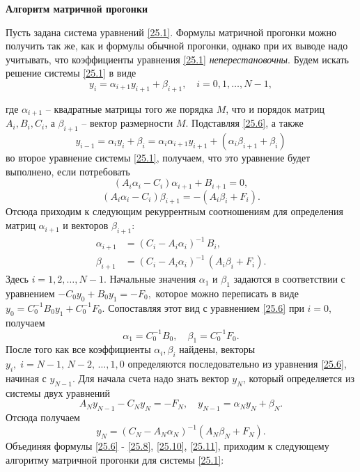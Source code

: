 \textbf{Алгоритм матричной прогонки}

Пусть задана система уравнений \eqref{25.1}. Формулы матричной прогонки можно получить так же, как и формулы обычной прогонки, однако при их выводе надо учитывать, что коэффициенты уравнения \eqref{25.1} \textit{неперестановочны}. Будем искать решение системы \eqref{25.1} в виде 
\begin{equation}\label{25.6}
    y_i = \alpha_{i+1} y_{i+1} + \beta_{i+1}, \quad i = 0, 1, \ldots, N-1,
\end{equation}

где $\alpha_{i+1}$ -- квадратные матрицы того же порядка $M$, что и порядок матриц $A_i, B_i, C_i$, а $\beta_{i+1}$ -- вектор размерности $M$. Подставляя \eqref{25.6}, а также 
$$y_{i-1} = \alpha_{i} y_{i} + \beta_{i} = \alpha_i \alpha_{i+1} y_{i+1} + (\alpha_i \beta_{i+1} + \beta_i)$$ 
во второе уравнение системы \eqref{25.1}, получаем, что это уравнение будет выполнено, если потребовать 
$$
(A_i \alpha_i - C_i) \alpha_{i+1} + B_{i+1} = 0,
$$
$$
(A_i \alpha_i - C_i) \beta_{i+1} = - (A_i\beta_i + F_i).
$$
Отсюда приходим к следующим рекуррентным соотношениям для определения матриц $\alpha_{i+1}$ и векторов $\beta_{i+1}$:
\begin{align}\label{25.7}
    \alpha_{i+1} &= (C_i - A_i \alpha_i)^{-1} \, B_i,\\
    \label{25.8}
    \beta_{i+1} &= (C_i - A_i \alpha_i)^{-1} \,(A_i \beta_i + F_i).
\end{align}
Здесь $i = 1, 2, \ldots, N-1$. Начальные значения $\alpha_1$ и $\beta_1$ задаются в соответствии с уравнением $-C_0 y_0 + B_0 y_1 = -F_0,$ которое можно переписать в виде $y_0 = C_0^{-1} B_0 y_1 + C_0^{-1}F_0$.
Сопоставляя этот вид с уравнением \eqref{25.6} при $i = 0$, получаем
\begin{equation}\label{25.10}
    \alpha_1 = C_0^{-1}B_0, \quad \beta_1 = C_0^{-1}F_0.
\end{equation}
После того как все коэффициенты $\alpha_i, \beta_i$ найдены, векторы $y_i, \; i = N-1, \,N-2, \,\ldots, 1, 0$ определяются последовательно из уравнения \eqref{25.6}, начиная с $y_{N-1}$. Для начала счета надо знать вектор $y_N$, который определяется из системы двух уравнений 
$$
A_N y_{N-1} - C_N y_N = - F_N, \quad y_{N-1} = \alpha_N y_N + \beta_N.
$$
Отсюда получаем 
\begin{equation}\label{25.11}
    y_N = (C_N - A_N \alpha_N)^{-1} (A_N \beta_N + F_N).
\end{equation}
Объединяя формулы \eqref{25.6} - \eqref{25.8}, \eqref{25.10}, \eqref{25.11}, приходим к следующему алгоритму матричной прогонки для системы \eqref{25.1}: 
